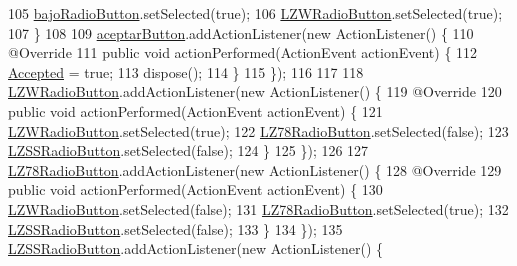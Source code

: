 \begin{DoxyCode}
105             \hyperlink{classpresentacion_1_1form_1_1PopUp__Comp_add9532658d448dcbfa9b7dd40ddc8b38}{bajoRadioButton}.setSelected(\textcolor{keyword}{true});
106             \hyperlink{classpresentacion_1_1form_1_1PopUp__Comp_a810fe251f9c88e3b83ce466feafafe2e}{LZWRadioButton}.setSelected(\textcolor{keyword}{true});
107         \}
108 
109         \hyperlink{classpresentacion_1_1form_1_1PopUp__Comp_a6321172d7f93f607a1cea6e2eee6a6ea}{aceptarButton}.addActionListener(\textcolor{keyword}{new} ActionListener() \{
110             @Override
111             \textcolor{keyword}{public} \textcolor{keywordtype}{void} actionPerformed(ActionEvent actionEvent) \{
112                 \hyperlink{classpresentacion_1_1form_1_1PopUp__Comp_af8e9310f7ff94d5a8cc917c66536bfde}{Accepted} = \textcolor{keyword}{true};
113                 dispose();
114             \}
115         \});
116 
117 
118         \hyperlink{classpresentacion_1_1form_1_1PopUp__Comp_a810fe251f9c88e3b83ce466feafafe2e}{LZWRadioButton}.addActionListener(\textcolor{keyword}{new} ActionListener() \{
119             @Override
120             \textcolor{keyword}{public} \textcolor{keywordtype}{void} actionPerformed(ActionEvent actionEvent) \{
121                 \hyperlink{classpresentacion_1_1form_1_1PopUp__Comp_a810fe251f9c88e3b83ce466feafafe2e}{LZWRadioButton}.setSelected(\textcolor{keyword}{true});
122                 \hyperlink{classpresentacion_1_1form_1_1PopUp__Comp_ac750ecbde516e2fee470693124d2ff63}{LZ78RadioButton}.setSelected(\textcolor{keyword}{false});
123                 \hyperlink{classpresentacion_1_1form_1_1PopUp__Comp_ad18c1029f04cc43d033183dca943977c}{LZSSRadioButton}.setSelected(\textcolor{keyword}{false});
124             \}
125         \});
126 
127         \hyperlink{classpresentacion_1_1form_1_1PopUp__Comp_ac750ecbde516e2fee470693124d2ff63}{LZ78RadioButton}.addActionListener(\textcolor{keyword}{new} ActionListener() \{
128             @Override
129             \textcolor{keyword}{public} \textcolor{keywordtype}{void} actionPerformed(ActionEvent actionEvent) \{
130                 \hyperlink{classpresentacion_1_1form_1_1PopUp__Comp_a810fe251f9c88e3b83ce466feafafe2e}{LZWRadioButton}.setSelected(\textcolor{keyword}{false});
131                 \hyperlink{classpresentacion_1_1form_1_1PopUp__Comp_ac750ecbde516e2fee470693124d2ff63}{LZ78RadioButton}.setSelected(\textcolor{keyword}{true});
132                 \hyperlink{classpresentacion_1_1form_1_1PopUp__Comp_ad18c1029f04cc43d033183dca943977c}{LZSSRadioButton}.setSelected(\textcolor{keyword}{false});
133             \}
134         \});
135         \hyperlink{classpresentacion_1_1form_1_1PopUp__Comp_ad18c1029f04cc43d033183dca943977c}{LZSSRadioButton}.addActionListener(\textcolor{keyword}{new} ActionListener() \{

\end{DoxyCode}
